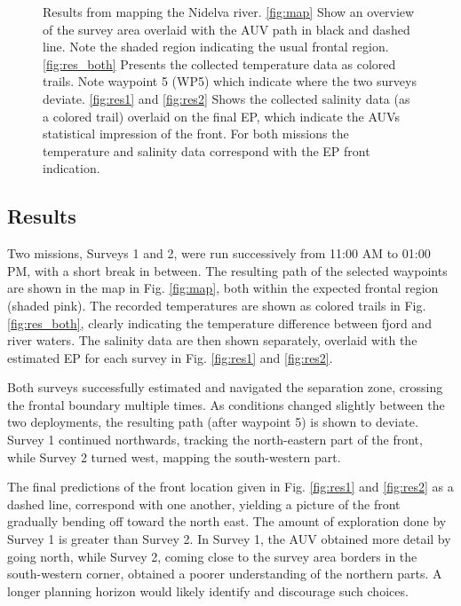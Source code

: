 \documentclass[aoas]{imsart}
\begin{document}
\begin{figure}[!h]
\caption{Results from mapping the Nidelva river. \ref{fig:map} Show an
  overview of the survey area overlaid with the AUV path in black and
  dashed line. Note the shaded region indicating the usual frontal
  region. \ref{fig:res_both} Presents the collected temperature data
  as colored trails. Note waypoint 5 (WP5) which indicate where the
  two surveys deviate. \ref{fig:res1} and \ref{fig:res2} Shows the
  collected salinity data (as a colored trail) overlaid on the final
  EP, which indicate the AUVs statistical impression of the front. For
  both missions the temperature and salinity data correspond with the
  EP front indication.}
\label{fig:results}
\end{figure}

\subsection{Results}

Two missions, Surveys 1 and 2, were run successively from 11:00 AM to
01:00 PM, with a short break in between. The resulting path of the
selected waypoints are shown in the map in Fig. \ref{fig:map}, both
within the expected frontal region (shaded pink). The recorded
temperatures are shown as colored trails in Fig. \ref{fig:res_both},
clearly indicating the temperature difference between fjord and river
waters. The salinity data are then shown separately, overlaid with the
estimated EP for each survey in Fig. \ref{fig:res1} and
\ref{fig:res2}.

Both surveys successfully estimated and navigated the separation zone,
crossing the frontal boundary multiple times. As conditions changed
slightly between the two deployments, the resulting path (after
waypoint 5) is shown to deviate. Survey 1 continued northwards,
tracking the north-eastern part of the front, while Survey 2 turned
west, mapping the south-western part.

The final predictions of the front location given in
Fig. \ref{fig:res1} and \ref{fig:res2} as a dashed line, correspond
with one another, yielding a picture of the front gradually bending
off toward the north east. The amount of exploration done by Survey 1
is greater than Survey 2. In Survey 1, the AUV obtained more detail by
going north, while Survey 2, coming close to the survey area borders
in the south-western corner, obtained a poorer understanding of the
northern parts. A longer planning horizon would likely identify and
discourage such choices.
\end{document}
